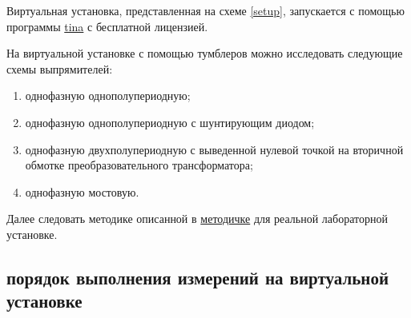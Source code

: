 Виртуальная установка, представленная на схеме \ref{setup}, запускается с помощью программы \href{http://www.ti.com/tool/TINA-TI}{tina} с бесплатной лицензией.

На виртуальной установке с помощью тумблеров можно исследовать следующие схемы выпрямителей:

\begin{enumerate}
\item \label{one-phase-half-period} однофазную однополупериодную;
\item \label{one-phase-half-period-with-shunt} однофазную однополупериодную с шунтирующим диодом;
\item \label{two-half-period} однофазную двухполупериодную с выведенной нулевой точкой на вторичной обмотке преобразовательного трансформатора;
\item \label{one-phase-bridge} однофазную мостовую.
\end{enumerate}

Далее следовать методике описанной в \href{https://github.com/trot-t/power_el_method_old/blob/master/%D0%A1%D0%B8%D0%BB%D0%BE%D0%B2%D0%B0%D1%8F%20%D1%8D%D0%BB%D0%B5%D0%BA%D1%82%D1%80%D0%BE%D0%BD%D0%B8%D0%BA%D0%B0%20%D0%BC%D0%B5%D1%82%D0%BE%D0%B4%D0%B8%D1%87%D0%BA%D0%B0%20%D0%BB%D0%B0%D0%B1%D0%BE%D1%80%D0%B0%D1%82%D0%BE%D1%80%D0%BD%D1%8B%D0%B5.pdf}{методичке} для реальной лабораторной установке.


\subsection{порядок выполнения измерений на виртуальной установке}

